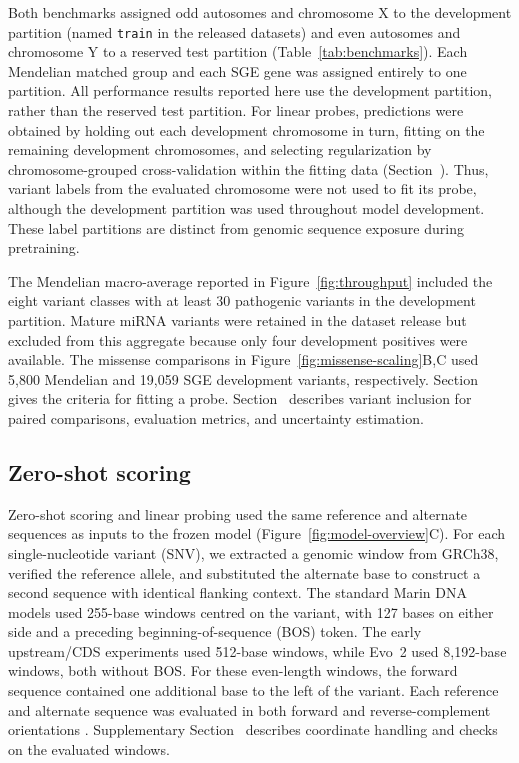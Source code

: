\documentclass[a4paper,num-refs]{oup-contemporary}
\begin{document}
Both benchmarks assigned odd autosomes and chromosome X to the
development partition (named \texttt{train} in the released datasets)
and even autosomes and chromosome Y to a reserved test partition
(Table~\ref{tab:benchmarks}).
Each Mendelian matched group and each SGE gene was assigned entirely
to one partition.
All performance results reported here use the development partition,
rather than the reserved test partition.
For linear probes, predictions were obtained by holding out each
development chromosome in turn, fitting on the remaining development
chromosomes, and selecting regularization by chromosome-grouped
cross-validation within the fitting data
(Section~).
Thus, variant labels from the evaluated chromosome were not used
to fit its probe, although the development partition was used
throughout model development.
These label partitions are distinct from genomic sequence exposure
during pretraining.

The Mendelian macro-average reported in Figure~\ref{fig:throughput}
included the eight variant classes with at least 30 pathogenic
variants in the development partition.
Mature miRNA variants were retained in the dataset release but
excluded from this aggregate because only four development
positives were available.
The missense comparisons in Figure~\ref{fig:missense-scaling}B,C
used 5,800 Mendelian and 19,059 SGE development variants,
respectively.
Section~ gives the criteria for fitting a probe.
Section~ describes variant inclusion for
paired comparisons, evaluation metrics, and uncertainty estimation.


\subsection{Zero-shot scoring}
\label{methods:scoring}

Zero-shot scoring and linear probing used the same reference and
alternate sequences as inputs to the frozen model
(Figure~\ref{fig:model-overview}C).
For each single-nucleotide variant (SNV), we extracted a genomic
window from GRCh38, verified the reference allele, and substituted
the alternate base to construct a second sequence with identical
flanking context.
The standard Marin DNA models used 255-base windows centred on
the variant, with 127 bases on either side and a preceding
beginning-of-sequence (BOS) token.
The early upstream/CDS experiments used 512-base windows, while
Evo~2 used 8,192-base windows, both without BOS.
For these even-length windows, the forward sequence contained
one additional base to the left of the variant.
Each reference and alternate sequence was evaluated in both
forward and reverse-complement orientations
\citep{marindnabencheval,marindnaevo2code}.
Supplementary Section~ describes coordinate
handling and checks on the evaluated windows.
\end{document}

